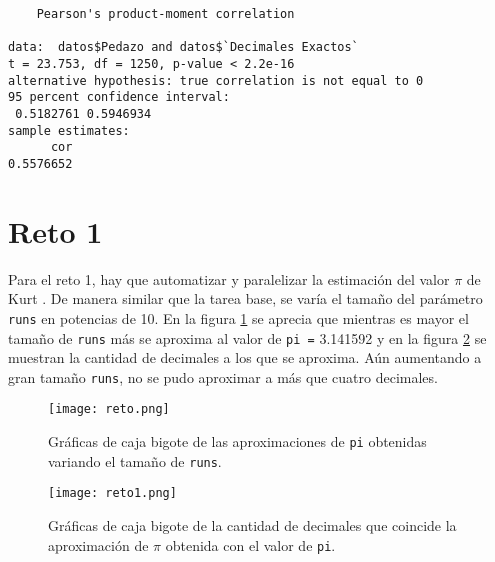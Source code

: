 \documentclass[12pt,letterpaper]{article}
\begin{document}
\begin{verbatim}
	Pearson's product-moment correlation

data:  datos$Pedazo and datos$`Decimales Exactos`
t = 23.753, df = 1250, p-value < 2.2e-16
alternative hypothesis: true correlation is not equal to 0
95 percent confidence interval:
 0.5182761 0.5946934
sample estimates:
      cor 
0.5576652 
\end{verbatim}




\section{Reto 1}
Para el reto 1, hay que automatizar y paralelizar la estimación del valor $\pi$ de Kurt \cite{Kurt}. De manera similar que la tarea base, se varía el tamaño del parámetro \texttt{runs} en potencias de 10. En la figura \ref{box3} se aprecia que mientras es mayor el tamaño de \texttt{runs} más se aproxima al valor de \texttt{pi =} 3.141592 y en la figura \ref{box4} se muestran la cantidad de decimales a los que se aproxima. Aún aumentando a gran tamaño \texttt{runs}, no se pudo aproximar a más que cuatro decimales. 
\begin{figure}
	\centering
	\texttt{[image: reto.png]}
	\caption{Gráficas de caja bigote de las aproximaciones de \texttt{pi} obtenidas variando el tamaño de \texttt{runs}.}
	\label{box3}
\end{figure}

\begin{figure}
	\centering
	\texttt{[image: reto1.png]}
	\caption{Gráficas de caja bigote de la cantidad de decimales que coincide la aproximación de $\pi$ obtenida con el valor de \texttt{pi}.}
	\label{box4}
\end{figure}
 

\end{document}
